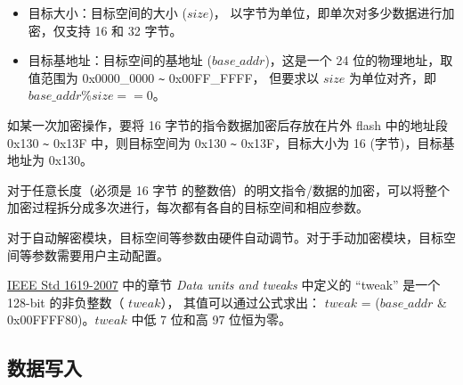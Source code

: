 \documentclass[main\_\_CN.tex]{subfiles}
\begin{document}
\begin{itemize}
    \item 目标大小：目标空间的大小 (\begin{math} size \end{math})， 以字节为单位，即单次对多少数据进行加密，仅支持 16 和 32 字节。
    \item 目标基地址：目标空间的基地址 (\begin{math} base\_addr\end{math})，这是一个 24 位的物理地址，取值范围为 0x0000\_0000 \verb+~+ 0x00FF\_FFFF， 但要求以 \begin{math} size \end{math} 为单位对齐，即 \begin{math} base\_addr \% size == 0 \end{math}。
\end{itemize}

如某一次加密操作，要将 16 字节的指令数据加密后存放在片外 flash 中的地址段 0x130 \verb+~+ 0x13F 中，则目标空间为 0x130 \verb+~+ 0x13F，目标大小为 16 (字节)，目标基地址为 0x130。

对于任意长度（必须是 16 字节 的整数倍）的明文指令/数据的加密，可以将整个加密过程拆分成多次进行，每次都有各自的目标空间和相应参数。

对于自动解密模块，目标空间等参数由硬件自动调节。对于手动加密模块，目标空间等参数需要用户主动配置。

\begin{tiplisting}
\vspace{-2em}
\begin{enumerate}
     \href{https://ieeexplore.ieee.org/document/4493450}{IEEE Std 1619-2007} 中的章节 \textit{Data units and tweaks} 中定义的 “tweak”  是一个 128-bit 的非负整数（ \begin{math} tweak \end{math}），
    其值可以通过公式求出： \begin{math} tweak \end{math} = (\begin{math} base\_addr \end{math} \& 0x00FFFF80)。\begin{math} tweak \end{math} 中低 7 位和高 97 位恒为零。
\end{enumerate}
\end{tiplisting}

\subsection{数据写入}
\label{sec:extmemncr-data-writing}
\end{document}

